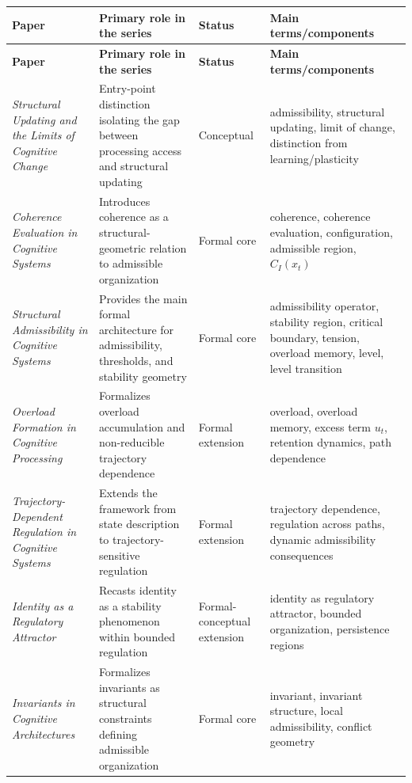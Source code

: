 \documentclass[11pt,a4paper]{article}
\begin{document}
	\begin{longtable}{>{\RaggedRight\arraybackslash}p{} >{\RaggedRight\arraybackslash}p{} >{\RaggedRight\arraybackslash}p{} >{\RaggedRight\arraybackslash}p{}}
		\toprule
		\textbf{Paper} & \textbf{Primary role in the series} & \textbf{Status} & \textbf{Main terms/components} \\
		\midrule
		\endfirsthead
		\toprule
		\textbf{Paper} & \textbf{Primary role in the series} & \textbf{Status} & \textbf{Main terms/components} \\
		\midrule
		\endhead
		\emph{Structural Updating and the Limits of Cognitive Change} & Entry-point distinction isolating the gap between processing access and structural updating & Conceptual & admissibility, structural updating, limit of change, distinction from learning/plasticity \\
		\emph{Coherence Evaluation in Cognitive Systems} & Introduces coherence as a structural-geometric relation to admissible organization & Formal core & coherence, coherence evaluation, configuration, admissible region, $C_I(x_t)$ \\
		\emph{Structural Admissibility in Cognitive Systems} & Provides the main formal architecture for admissibility, thresholds, and stability geometry & Formal core & admissibility operator, stability region, critical boundary, tension, overload memory, level, level transition \\
		\emph{Overload Formation in Cognitive Processing} & Formalizes overload accumulation and non-reducible trajectory dependence & Formal extension & overload, overload memory, excess term $u_t$, retention dynamics, path dependence \\
		\emph{Trajectory-Dependent Regulation in Cognitive Systems} & Extends the framework from state description to trajectory-sensitive regulation & Formal extension & trajectory dependence, regulation across paths, dynamic admissibility consequences \\
		\emph{Identity as a Regulatory Attractor} & Recasts identity as a stability phenomenon within bounded regulation & Formal-conceptual extension & identity as regulatory attractor, bounded organization, persistence regions \\
		\emph{Invariants in Cognitive Architectures} & Formalizes invariants as structural constraints defining admissible organization & Formal core & invariant, invariant structure, local admissibility, conflict geometry \\

\end{longtable}
\end{document}

